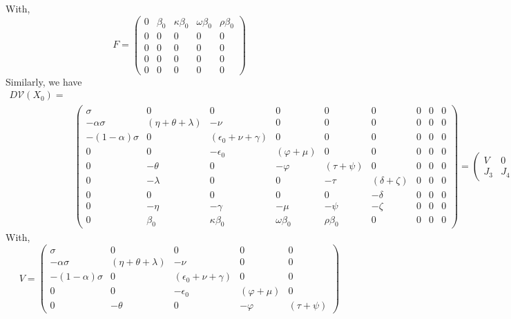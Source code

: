 \documentclass[10pt]{wlscirep}
\begin{document}
%
%
With,
%
%
\begin{equation}
F = \begin{pmatrix}
0 & \beta_0 & \kappa \beta_0 & \omega \beta_0 & \rho \beta_0 \\
0 & 0 & 0 & 0 & 0\\
0 & 0 & 0 & 0 & 0\\
0 & 0 & 0 & 0 & 0\\
0 & 0 & 0 & 0 & 0
  \end{pmatrix}
\nonumber
  \label{eqn:DFE-2}
\end{equation}
%
%
Similarly, we have 
%
%
\begin{equation}
\begin{split}
D \mathcal{V}(X_0) = \\
&\begin{pmatrix}
\sigma & 0 & 0 & 0 & 0 & 0 &0 & 0 &0 \\
-\alpha \sigma & \left( \eta + \theta + \lambda\right)  & - \nu & 0 & 0 & 0 &0 & 0 &0 \\
-\left( 1- \alpha \right) \sigma & 0 & \left( \epsilon_0 + \nu + \gamma \right) & 0 & 0 & 0 &0 & 0 &0 \\
0 & 0 & - \epsilon_0 & \left( \varphi + \mu\right)  & 0 & 0 &0 & 0 &0 \\
0 & -\theta & 0 & -\varphi & \left( \tau + \psi\right)  & 0 &0 & 0 &0 \\
0 & -\lambda & 0 & 0 & -\tau & \left( \delta + \zeta\right)  &0 & 0 &0 \\
0 & 0 & 0 & 0 & 0 & -\delta &0 & 0 &0 \\
0 & -\eta & -\gamma & -\mu & -\psi & -\zeta &0 & 0 &0 \\
0 & \beta_0 & \kappa\beta_0 & \omega\beta_0 & \rho\beta_0 & 0 &0 & 0 &0
  \end{pmatrix} =\begin{pmatrix}
  V & 0\\
  J_3 & J_4
  \end{pmatrix}
\end{split}
\label{eqn:DFE-3}
\end{equation}
%
%
With,
%
%
\begin{equation}
V = \begin{pmatrix}
\sigma & 0 & 0 & 0 & 0\\
-\alpha \sigma & \left( \eta + \theta + \lambda\right)  & - \nu & 0 & 0\\
-\left( 1- \alpha \right) \sigma & 0 & \left( \epsilon_0 + \nu + \gamma \right) & 0 & 0\\
0 & 0 & - \epsilon_0 & \left( \varphi + \mu\right)  & 0\\
0 & -\theta & 0 & -\varphi & \left( \tau + \psi\right)
\end{pmatrix}
\nonumber
\label{eqn:DFE-4}
\end{equation}
\end{document}

